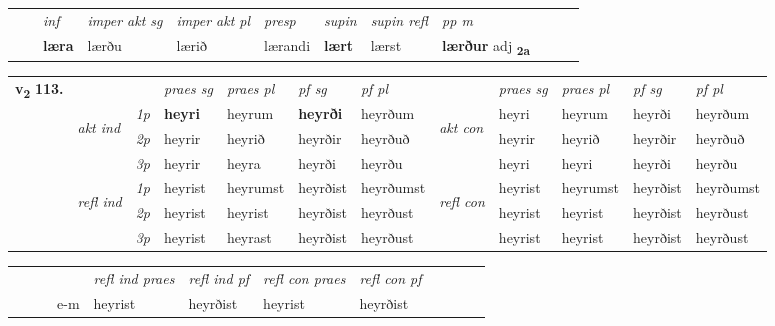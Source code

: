\begin{tabular}{llllllllllll}
 & & \textit{inf} & \textit{imper akt sg} & \textit{imper akt pl}   & \textit{presp} & \textit{supin} & \textit{supin refl} & \textit{pp m}     \\*
  & & \textbf{læra} & lærðu  & lærið   & lærandi &  \textbf{lært} & lærst & \textbf{lærður} adj \textbf{\textsubscript{2a}} \\*
\cmidrule{1-12}
\end{tabular}



\begin{tabular}{llllllllllll} \toprule
\multirow{4}{*}{{{\textbf{v{\textsubscript{2}}} \Large{\textbf{113.}}}}}  & &   &  \textit{praes sg}  & \textit{praes pl}  &\textit{ pf sg} & \textit{pf pl} &  &  \textit{praes sg}  & \textit{praes pl}  & \textit{pf sg} & \textit{pf pl } \\*
	\cmidrule{4-7} \cmidrule{9-12}
 & \multirow{3}{*}{\begin{turn}{90}\textit{akt ind}\end{turn}} & {\textit{1p}} & \textbf{heyri} & heyrum    & \textbf{heyrði} & heyrðum & \multirow{3}{*}{\begin{turn}{90}\textit{akt con}\end{turn}} &heyri & heyrum & heyrði & heyrðum\\*
& &  {\textit{2p}} &  heyrir  & heyrið   & heyrðir & heyrðuð & & heyrir & heyrið & heyrðir & heyrðuð \\*
& &  {\textit{3p}} & heyrir & heyra   & heyrði & heyrðu & & heyri & heyri& heyrði & heyrðu  \\*
\cmidrule{4-7} \cmidrule{9-12}
 &\multirow{3}{*}{\begin{turn}{90}\textit{refl ind}\end{turn}} & {\textit{1p}} & heyrist & heyrumst    & heyrðist & heyrðumst & \multirow{3}{*}{\begin{turn}{90}\textit{refl con}\end{turn}}  &heyrist & heyrumst & heyrðist & heyrðumst\\*
 &&  {\textit{2p}} &  heyrist  & heyrist   & heyrðist & heyrðust & &heyrist & heyrist & heyrðist & heyrðust \\*
& &  {\textit{3p}} & heyrist & heyrast   & heyrðist & heyrðust & & heyrist & heyrist& heyrðist & heyrðust  \\*
\cmidrule{4-7} \cmidrule{9-12}
\end{tabular}


\begin{tabular}{llllllllllll}
 & &  & &  \textit{refl ind praes} & \textit{refl ind pf} & \textit{refl con praes} & \textit{refl con pf} \\*
&  & & e-m & heyrist & heyrðist & heyrist & heyrðist \\*
\cmidrule{5-9}
\end{tabular}


